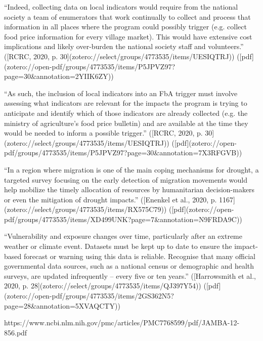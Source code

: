 “Indeed, collecting data on local indicators would require from the national society a team of enumerators that work continually to collect and process that information in all places where the program could possibly trigger (e.g. collect food price information for every village market). This would have extensive cost implications and likely over-burden the national society staff and volunteers.” ([RCRC, 2020, p. 30](zotero://select/groups/4773535/items/UESIQTRJ)) ([pdf](zotero://open-pdf/groups/4773535/items/P5JPVZ97?page=30&annotation=2YIIK6ZY))

“As such, the inclusion of local indicators into an FbA trigger must involve assessing what indicators are relevant for the impacts the program is trying to anticipate and identify which of those indicators are already collected (e.g. the ministry of agriculture's food price bulletin) and are available at the time they would be needed to inform a possible trigger.” ([RCRC, 2020, p. 30](zotero://select/groups/4773535/items/UESIQTRJ)) ([pdf](zotero://open-pdf/groups/4773535/items/P5JPVZ97?page=30&annotation=7X3RFGVB))


“In a region where migration is one of the main coping mechanisms for drought, a targeted survey focusing on the early detection of migration movements would help mobilize the timely allocation of resources by humanitarian decision-makers or even the mitigation of drought impacts.” ([Enenkel et al., 2020, p. 1167](zotero://select/groups/4773535/items/RX575C79)) ([pdf](zotero://open-pdf/groups/4773535/items/XD499UNK?page=7&annotation=N9FRDA9C))



“Vulnerability and exposure changes over time, particularly after an extreme weather or climate event. Datasets must be kept up to date to ensure the impact-based forecast or warning using this data is reliable. Recognise that many official governmental data sources, such as a national census or demographic and health surveys, are updated infrequently – every five or ten years.” ([Harrowsmith et al., 2020, p. 28](zotero://select/groups/4773535/items/QJ397Y54)) ([pdf](zotero://open-pdf/groups/4773535/items/2GS362N5?page=28&annotation=5XVAQCTY))





https://www.ncbi.nlm.nih.gov/pmc/articles/PMC7768599/pdf/JAMBA-12-856.pdf

